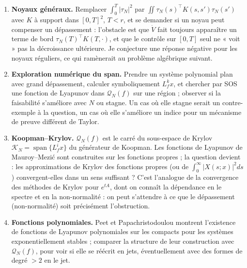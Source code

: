 \documentclass[11pt,a4paper]{article}
\theoremstyle{definition}
\theoremstyle{remark}
\newcommand{\tr}{^{\top}}
\begin{document}
\begin{enumerate}[nosep,label=(\alph*)]
\item \textbf{Noyaux généraux.} Remplacer $\int_0^T|\tau_N|^2$ par $\iint\tau_N(s)\tr K(s,s')\tau_N(s')$ avec $K$ à support dans $[0,T]^2$, $T<r$, et se demander si un noyau peut compenser un dépassement : l'obstacle est que $\dot V$ fait toujours apparaître un terme de bord $\tau_N(T)\tr K(T,\cdot)$, et que le contrôle sur $[0,T]$ seul ne « voit » pas la décroissance ultérieure. Je conjecture une réponse négative pour les noyaux réguliers, ce qui ramènerait au problème algébrique suivant.
\item \textbf{Exploration numérique du span.} Prendre un système polynomial plan avec grand dépassement, calculer symboliquement $L_f^kx$, et chercher par SOS une fonction de Lyapunov dans $\mathcal Q_N(f)$ sur une région ; observer si la faisabilité s'améliore avec $N$ ou stagne. Un cas où elle stagne serait un contre-exemple à la question, un cas où elle s'améliore un indice pour un mécanisme de preuve différent de Taylor.
\item \textbf{Koopman–Krylov.} $\mathcal Q_N(f)$ est le carré du sous-espace de Krylov $\mathcal K_N = \operatorname{span}\{L_f^ix\}$ du générateur de Koopman. Les fonctions de Lyapunov de Mauroy–Mezić \cite{MM} sont construites sur les fonctions propres ; la question devient : les approximations de Krylov des fonctions propres (ou de $\int_0^\infty|X(s;x)|^2ds$) convergent-elles dans un sens suffisant ? C'est l'analogue de la convergence des méthodes de Krylov pour $e^{tA}$, dont on connaît la dépendance en le spectre et en la non-normalité : on peut s'attendre à ce que le dépassement (non-normalité) soit précisément l'obstruction.
\item \textbf{Fonctions polynomiales.} Peet et Papachristodoulou \cite{Peet} montrent l'existence de fonctions de Lyapunov polynomiales sur les compacts pour les systèmes exponentiellement stables ; comparer la structure de leur construction avec $\mathcal Q_N(f)$, pour voir si elle se réécrit en jets, éventuellement avec des formes de degré $>2$ en le jet.
\end{enumerate}
\end{document}
